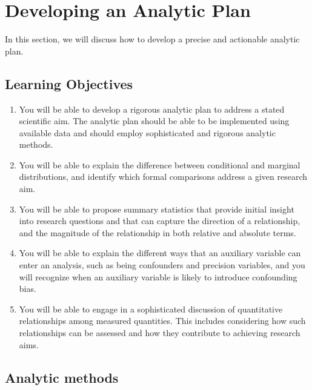 \section{Developing an Analytic Plan}
\label{sec:3.2}

In this section, we will discuss how to develop a precise and actionable analytic plan.

\subsection{Learning Objectives}

\begin{enumerate}

\item You will be able to develop a rigorous analytic plan to address a stated scientific aim.  The analytic plan should be able to be implemented using available data and should employ sophisticated and rigorous analytic methods.

\item You will be able to explain the difference between conditional and marginal distributions, and identify which formal comparisons address a given research aim.

\item You will be able to propose summary statistics that provide initial insight into research questions and that can capture the direction of a relationship, and the magnitude of the relationship in both relative and absolute terms.

\item You will be able to explain the different ways that an auxiliary variable can enter an analysis, such as being confounders and precision variables, and you will recognize when an auxiliary variable is likely to introduce confounding bias.

\item You will be able to engage in a sophisticated discussion of quantitative relationships among measured quantities. This includes considering how such relationships can be assessed and how they contribute to achieving research aims.

\end{enumerate}

\subsection{Analytic methods}

